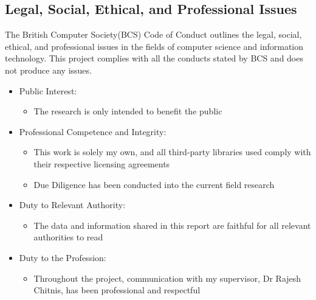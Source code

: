 \begin{center}
\section{Legal, Social, Ethical, and Professional Issues}
\end{center}

The British Computer Society(BCS) Code of Conduct\cite{BCSCodeOfConduct} outlines the legal, social, ethical, and professional issues in the fields of computer science and information technology. This project complies with all the conducts stated by BCS and does not produce any issues.

\begin{itemize}
    \item Public Interest:
    \begin{itemize}
    \item The research is only intended to benefit the public
    \end{itemize}
    
    \item Professional Competence and Integrity:
    \begin{itemize}
    \item This work is solely my own, and all third-party libraries used comply with their respective licensing agreements
    \item Due Diligence has been conducted into the current field research
    \end{itemize}
    
    \item Duty to Relevant Authority:
    \begin{itemize}
    \item The data and information shared in this report are faithful for all relevant authorities to read
    \end{itemize}
    
    \item Duty to the Profession:
    \begin{itemize}
    \item Throughout the project, communication with my supervisor, Dr Rajesh Chitnis, has been professional and respectful
    \end{itemize}
    
\end{itemize}